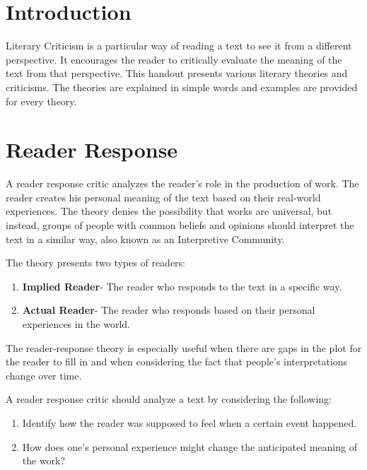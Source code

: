 \documentclass[11pt, twocolumn]{article}
\begin{document}
\begin{twocolumn}
\maketitle
\section{Introduction}
Literary Criticism is a particular way of reading a text to see it from a different perspective. It encourages the reader to critically evaluate the meaning of the text from that perspective.
This handout presents various literary theories and criticisms.
The theories are explained in simple words and examples are provided for every theory.


\section{Reader Response}

A reader response critic analyzes the reader's role in the production of work.
The reader creates his personal meaning of the text based on their real-world experiences.
The theory denies the possibility that works are universal, but instead, groups of people with common beliefs and opinions should interpret the text in a similar way, also known as an Interpretive Community.

The theory presents two types of readers:
\begin{enumerate}
        \item \textbf{Implied Reader}- The reader who responds to the text in a specific way.
        \item \textbf{Actual Reader}- The reader who responds based on their personal experiences in the world.
\end{enumerate}

The reader-response theory is especially useful when there are gaps in the plot for the reader to fill in and when considering the fact that people's interpretations change over time.

A reader response critic should analyze a text by considering the following:
\begin{enumerate}
        \item Identify how the reader was supposed to feel when a certain event happened.
        \item How does one's personal experience might change the anticipated meaning of the work?
\end{enumerate}


\end{twocolumn}
\end{document}

